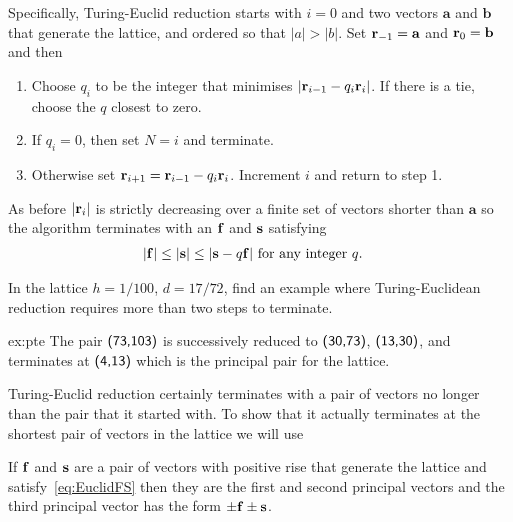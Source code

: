 Specifically, Turing-Euclid reduction starts with 
$i=0$ and two vectors $\mathbf{a}$ and $\mathbf{b}$ that generate the lattice, and ordered so that
$|a|>|b|$. Set $\mathbf{r}_{-1}=\mathbf{a}$ and $\mathbf{r}_{0}=\mathbf{b}$ and then
\begin{enumerate}
	\item Choose $q_i$ to be the integer that minimises  $|\mathbf{r}_{i-1}-q_i\mathbf{r}_{i}|$. If there is a tie, choose the $q$ closest to zero. 
	\item If $q_i=0$, then set $N=i$ and terminate.	
	\item Otherwise set  $\mathbf{r}_{i+1}=\mathbf{r}_{i-1}-q_i\mathbf{r}_{i}$. Increment $i$ and return to step 1.
\end{enumerate}
As before $|\mathbf{r}_{i}|$ is strictly decreasing over a finite set of vectors shorter than $\mathbf{a}$ so the algorithm terminates with an $\mathbf{f}$ and $\mathbf{s}$ satisfying 
\begin{align}
	\label{eq:EuclidFS}
	|\mathbf{f}|&\leq|\mathbf{s}| \leq |\mathbf{s}-q\mathbf{f}| \mbox{ for any integer $q$}.
\end{align}

\begin{jExercise}\label{ex:pte}
	In the lattice $h=1/100$, $d=17/72$, find an example where Turing-Euclidean reduction  requires more than two steps to terminate.
\end{jExercise}
\begin{jAnswer}{ex:pte}{
	The pair $\textsf{(73,103)}$ is successively reduced to $\textsf{(30,73)}$, $\textsf{(13,30)}$, and terminates at $\textsf{(4,13)}$ which  is the principal pair for the lattice. 
}\end{jAnswer}

Turing-Euclid reduction certainly terminates with a pair of vectors no longer than the pair that it started with. To show that it actually terminates at the shortest pair of vectors in the lattice we will use
\begin{theorem}
	If $\mathbf{f}$ and $\mathbf{s}$ are a pair of vectors with positive rise that generate the lattice and satisfy~\eqref{eq:EuclidFS} then they are the first and second principal vectors and the third principal vector has the form $\pm\mathbf{f}\pm\mathbf{s}$. 
	\label{thm:third}
\end{theorem}

